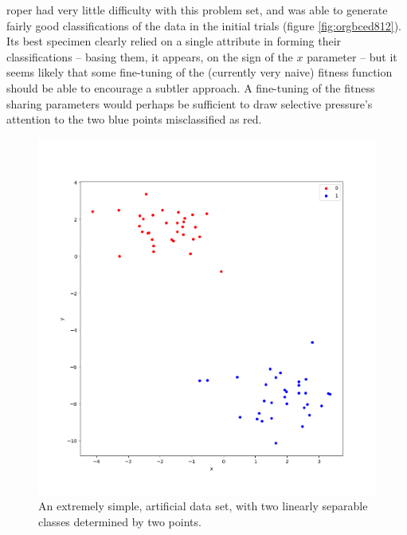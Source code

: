 \documentclass[12pt,glossary]{dalthesis}
\begin{document}
\gls{roper} had very little difficulty with this problem set, and was able to
generate fairly good classifications of the data in the initial trials (figure 
\ref{fig:orgbced812}). Its best specimen clearly relied on a single
attribute in forming their classifications -- basing them, it appears, on the
sign of the \(x\) parameter -- but it seems likely that some fine-tuning of the
(currently very naive) fitness function should be able to encourage a subtler
approach. A fine-tuning of the fitness sharing parameters would perhaps be
sufficient to draw selective pressure's attention to the two blue points
misclassified as red.

\begin{figure}[htbp]
\centering
\includegraphics[width=.9\linewidth]{../images/plots/2_simple_blobs.png}
\caption{\label{fig:orga6e7582}
An extremely simple, artificial data set, with two linearly separable classes determined by two points.}
\end{figure}
\end{document}
